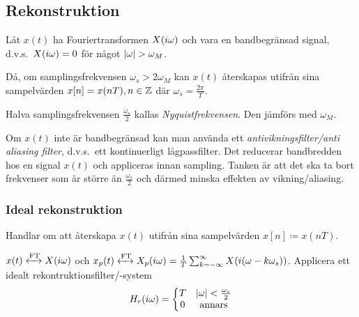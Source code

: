 \documentclass[a4paper]{article}
\begin{document}
\providecommand\fname{}
\renewcommand\fname{19-09-25}

\subsection{Rekonstruktion}
\begin{sats}[Samplingsteoremet]
    Låt \(
        x(t)
    \) ha Fouriertransformen \(
        X(i\omega)
    \) och vara en bandbegränsad signal, d.v.s.\ \(
        X(i\omega) = 0 
    \) för något \(
        \abs{\omega} > \omega_M
    \).
    
    Då, om samplingsfrekvensen \(
        \omega_s > 2\omega_M
    \) kan \(
        x(t)
    \) återskapas utifrån sina sampelvärden \(
        x[n] = x(nT), n \in \mathbb{Z}
    \) där \(
        \omega_s = \frac{2\pi}{T} 
    \).
\end{sats}

\begin{defn}[Nyquistfrekvens]
    Halva samplingsfrekvensen \(
        \frac{\omega_s}{2}
    \) kallas \emph{Nyquistfrekvensen}.
    Den jämförs med \(
        \omega_M
    \).
\end{defn}

Om \(
    x(t)
\) inte är bandbegränsad kan man använda ett 
\emph{antivikningsfilter/anti aliasing filter}, d.v.s.\ ett kontinuerligt 
lågpassfilter. Det reducerar bandbredden hos en signal \(
    x(t)
\) och appliceras innan sampling. Tanken är att det ska ta bort 
frekvenser som är större än \(
    \frac{\omega_s}{2} 
\) och därmed minska effekten av vikning/aliasing.

\subsubsection{Ideal rekonstruktion}
Handlar om att återskapa \(
    x(t)
\) utifrån sina sampelvärden \(
    x[n] \coloneqq x(nT)
\). 

\(
    x(t) \xleftrightarrow{\text{FT}} X(i\omega)
\) och \(
    x_p(t) \xleftrightarrow{\text{FT}} X_p(i\omega) 
        = \frac{1}{T} \sum_{k=-\infty}^\infty X(i(\omega-k\omega_s))
\). Applicera ett idealt rekontruktionsfilter/-system 
\[
    H_r(i\omega) = 
    \left\{\begin{matrix}
        T & \abs{\omega} < \frac{\omega_s}{2}\\ 
        0 & \text{annars} 
    \end{matrix}\right.
\] 
\end{document}
